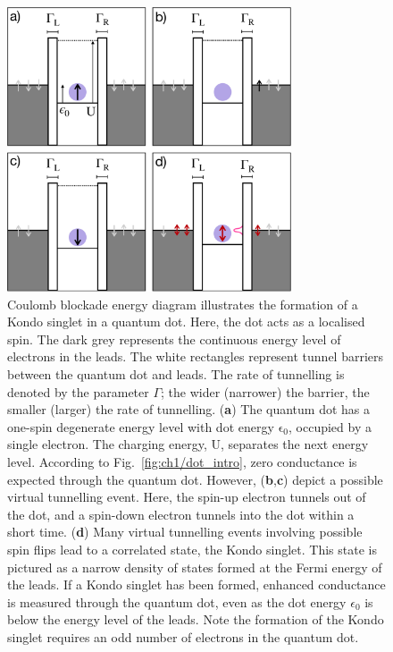 \begin{figure}[!hbt]
 \begin{center}
\includegraphics[width=0.75\textwidth]{figures/ch2/figure11.pdf}
\caption[Kondo Effect Illustration : Quantum Dot]{\label{fig:ch2/kondo_dot_diagram} 
Coulomb blockade energy diagram illustrates the formation of a Kondo singlet in a quantum dot. Here, the dot acts as a localised spin. The dark grey represents the continuous energy level of electrons in the leads. The white rectangles represent tunnel barriers between the quantum dot and leads. The rate of tunnelling is denoted by the parameter $\Gamma$; the wider (narrower) the barrier, the smaller (larger) the rate of tunnelling. (\textbf{a}) The quantum dot has a one-spin degenerate energy level with dot energy $\mathrm{\epsilon_0}$, occupied by a single electron. The charging energy, $\mathrm{U}$, separates the next energy level. According to Fig.~\ref{fig:ch1/dot_intro}, zero conductance is expected through the quantum dot. However, (\textbf{b},\textbf{c}) depict a possible virtual tunnelling event. Here, the spin-up electron tunnels out of the dot, and a spin-down electron tunnels into the dot within a short time. (\textbf{d}) Many virtual tunnelling events involving possible spin flips lead to a correlated state, the Kondo singlet. This state is pictured as a narrow density of states formed at the Fermi energy of the leads. If a Kondo singlet has been formed, enhanced conductance is measured through the quantum dot, even as the dot energy $\epsilon_0$ is below the energy level of the leads. Note the formation of the Kondo singlet requires an odd number of electrons in the quantum dot.
 }
 \end{center}
\end{figure}


